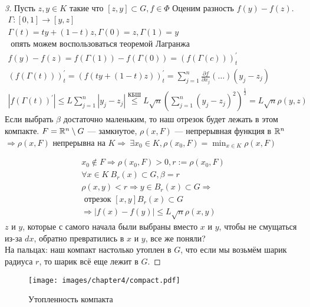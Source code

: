 \documentclass[document]{subfiles}
\begin{document}
\begin{proof}[3]
    Пусть $z, y \in K$ такие что $[z,y] \subset G, f \in \Phi$ 
Оценим разность $f(y) - f(z)$. 
    \begin{gather*}
        \Gamma: [0,1] \rightarrow [y,z] \\
        \Gamma(t) = ty + (1-t)z, \Gamma(0) = z, \Gamma(1) = y \\
        \text{ опять можем воспользоваться теоремой Лагранжа } \\
        f(y) - f(z) = f(\Gamma(1)) - f(\Gamma(0)) = (f(\Gamma(c)))^\prime_t \\
        (f(\Gamma(t)))^\prime_t = (f(ty + (1-t)z))^\prime_t = \sum^n_{j=1} \frac{\partial f}{\partial x_j} (\ldots) (y_j - z_j) \\
        |f(\Gamma(t))^\prime| \leq L \sum^n_{j=1} |y_j - z_j| \stackrel{\text{КБШ}}{\leq} L\sqrt{n} \left( \sum^n_{j=1} (y_j - z_j)^2 \right)^\frac{1}{2} = L \sqrt{n} \rho(y,z)
    \end{gather*}
    Если выбрать $\beta$ достаточно маленьким, то наш отрезок будет лежать в этом компакте. $F = \mathbb{R}^n \setminus G$ --- замкнутое, $\rho(x,F)$ --- непрерывная функция  в 
    $\mathbb{R}^n$ $\Rightarrow \rho(x,F)$ непрерывна на $K \Rightarrow \: \exists x_0 \in K, \rho(x_0,F) = \min_{x \in K} \rho(x,F)$

    \begin{gather*}
        x_0 \notin F \Rightarrow \rho(x_0, F) > 0, r := \rho(x_0, F) \\
        \forall x \in K \: B_r(x) \subset G, \beta = r \\
        \rho(x,y) < r \Rightarrow y \in B_r(x) \subset G \Rightarrow \\
        \text{ отрезок } [x,y] B_r(x) \subset G \\
        \Rightarrow |f(x) - f(y)| \leq L \sqrt{n} \rho(x,y)
    \end{gather*}
    $z$ и $y$, которые с самого начала были выбраны вместо $x$ и $y$, чтобы не смущаться из-за $dx$, обратно превратились в $x$ и $y$, все же поняли? \\
    На пальцах: наш компакт настолько утоплен в $G$, что если мы возьмём шарик радиуса $r$, то шарик всё еще лежит в $G$.
\end{proof}

\begin{figure}
    \centering
    \texttt{[image: images/chapter4/compact.pdf]}\caption{Утопленность компакта}
\end{figure}
\end{document}
